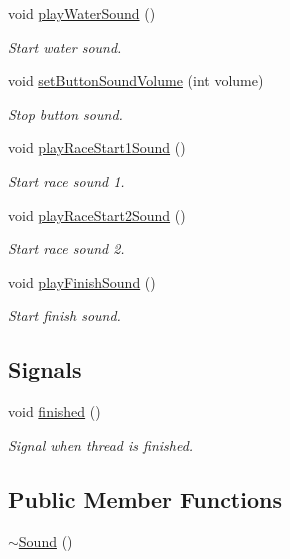 \begin{DoxyCompactItemize}
void \mbox{\hyperlink{class_sound_a2a51decbd81c7f83cb94ded9c6d9728c}{play\+Water\+Sound}} ()
\begin{DoxyCompactList}\small\item\em Start water sound. \end{DoxyCompactList}\item 
void \mbox{\hyperlink{class_sound_a1a7459e2d4cd022f3fc53a0a91a40890}{set\+Button\+Sound\+Volume}} (int volume)
\begin{DoxyCompactList}\small\item\em Stop button sound. \end{DoxyCompactList}\item 
void \mbox{\hyperlink{class_sound_af5b6e31181dfba9b236d79aacd862fee}{play\+Race\+Start1\+Sound}} ()
\begin{DoxyCompactList}\small\item\em Start race sound 1. \end{DoxyCompactList}\item 
void \mbox{\hyperlink{class_sound_a7dfc37a9a9e395e8b68a0d59009b8984}{play\+Race\+Start2\+Sound}} ()
\begin{DoxyCompactList}\small\item\em Start race sound 2. \end{DoxyCompactList}\item 
void \mbox{\hyperlink{class_sound_a9d8b76aaa9b830241ba00042d6c48e20}{play\+Finish\+Sound}} ()
\begin{DoxyCompactList}\small\item\em Start finish sound. \end{DoxyCompactList}\end{DoxyCompactItemize}
\subsection*{Signals}
\begin{DoxyCompactItemize}
\item 
void \mbox{\hyperlink{class_sound_a89d8715c7bb2fc7a0674eb214834c441}{finished}} ()
\begin{DoxyCompactList}\small\item\em Signal when thread is finished. \end{DoxyCompactList}\end{DoxyCompactItemize}
\subsection*{Public Member Functions}
\begin{DoxyCompactItemize}
\item 
\mbox{\hyperlink{class_sound_a0907389078bf740be2a5763366ad3376}{$\sim$\+Sound}} ()
\end{DoxyCompactItemize}
